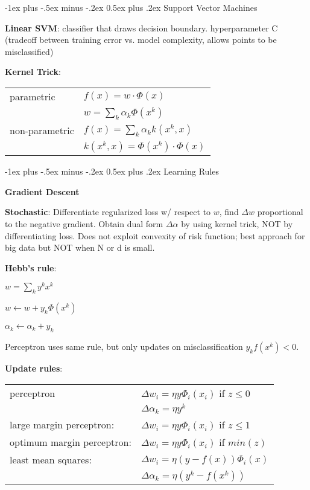 \documentclass[10pt,landscape]{article}
\makeatletter
\renewcommand{\section}{\@startsection{section}{1}{0mm}%
                                {-1ex plus -.5ex minus -.2ex}%
                                {0.5ex plus .2ex}%
                                {\normalfont\large\bfseries}}
\makeatother
\begin{document}
\begin{multicols}{3}

\section{Support Vector Machines}

\textbf{Linear SVM}: classifier that draws decision boundary. hyperparameter C (tradeoff between training error vs. model complexity, allows points to be misclassified)

\textbf{Kernel Trick}:

\begin{tabular}{@{}ll@{}}
parametric      & $f(x)=w \cdot \Phi(x)$ \\
                & $w = \sum_k \alpha_k \Phi(x^k)$ \\
non-parametric  & $f(x) = \sum_k \alpha_k k(x^k, x)$ \\
                & $k(x^k, x) = \Phi(x^k) \cdot \Phi(x)$
\end{tabular}


\section{Learning Rules}

\textbf{Gradient Descent}

\textbf{Stochastic}: Differentiate regularized loss w/ respect to $w$, find $\Delta w$ proportional to the negative gradient. Obtain dual form $\Delta \alpha$ by using kernel trick, NOT by differentiating loss. Does not exploit convexity of risk function; best approach for big data but NOT when N or d is small.

\textbf{Hebb's rule}:

$w = \sum_k y^k x^k$

$w \leftarrow w + y_k \Phi(x^k)$

$\alpha_k \leftarrow \alpha_k + y_k$

Perceptron uses same rule, but only updates on misclassification $y_k f(x^k) < 0$.

\textbf{Update rules}:

\begin{tabular}{@{}ll@{}}
perceptron                  & $\Delta w_i = \eta y \Phi_i(x_i)$ if $z \le 0$ \\
                            & $\Delta \alpha_k = \eta y^k$ \\
large margin perceptron:    & $\Delta w_i = \eta y \Phi_i(x_i)$ if $z \le 1$ \\
optimum margin perceptron:  & $\Delta w_i = \eta y \Phi_i(x_i)$ if $min(z)$ \\
least mean squares:         & $\Delta w_i = \eta (y - f(x)) \Phi_i (x)$ \\
                            & $\Delta \alpha_k = \eta (y^k - f(x^k))$
\end{tabular}


\end{multicols}
\end{document}
